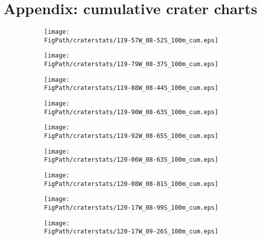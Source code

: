 %
%


% 

\section{Appendix: cumulative crater charts}\label{sec_cccharts}
\begin{figure}[h]
\centering
\caption[Individual cumulative crater frequency distributions]{Individual cumulative crater frequency distributions}
\begin{subfigure}{.33\textwidth}
  \texttt{[image: \\FigPath/craterstats/119-57W\_08-52S\_100m\_cum.eps]}
\end{subfigure}%
\begin{subfigure}{.33\textwidth}
  \texttt{[image: \\FigPath/craterstats/119-79W\_08-37S\_100m\_cum.eps]}
\end{subfigure}
\begin{subfigure}{.33\textwidth}
  \texttt{[image: \\FigPath/craterstats/119-88W\_08-44S\_100m\_cum.eps]}
\end{subfigure}
\begin{subfigure}{.33\textwidth}
  \texttt{[image: \\FigPath/craterstats/119-90W\_08-63S\_100m\_cum.eps]}
\end{subfigure}%
\begin{subfigure}{.33\textwidth}
  \texttt{[image: \\FigPath/craterstats/119-92W\_08-65S\_100m\_cum.eps]}
\end{subfigure}
\begin{subfigure}{.33\textwidth}
  \texttt{[image: \\FigPath/craterstats/120-06W\_08-63S\_100m\_cum.eps]}
\end{subfigure}
\begin{subfigure}{.33\textwidth}
  \texttt{[image: \\FigPath/craterstats/120-08W\_08-81S\_100m\_cum.eps]}
\end{subfigure}%
\begin{subfigure}{.33\textwidth}
  \texttt{[image: \\FigPath/craterstats/120-17W\_08-99S\_100m\_cum.eps]}
\end{subfigure}
\begin{subfigure}{.33\textwidth}
  \texttt{[image: \\FigPath/craterstats/120-17W\_09-26S\_100m\_cum.eps]}
\end{subfigure}
\end{figure}

